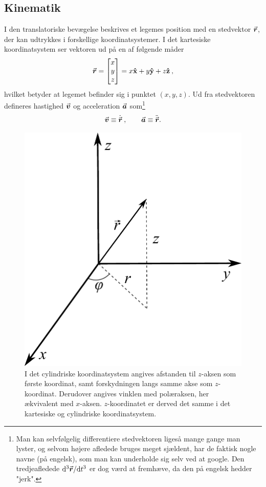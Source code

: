 \subsection{Kinematik}
I den translatoriske bevægelse beskrives et legemes position med en stedvektor ${\vec{\boldsymbol{r}}}$, der kan udtrykkes i forskellige koordinatsystemer. I det kartesiske koordinatsystem ser vektoren ud på en af følgende måder
%
\begin{align*}
	{\vec{\boldsymbol{r}}} = \begin{bmatrix} x \\ y \\ z \end{bmatrix} = x\mathbf{\hat{x}} + y\mathbf{\hat{y}} + z\mathbf{\hat{z}} \: ,
\end{align*}
%
hvilket betyder at legemet befinder sig i punktet $(x,y,z)$. Ud fra stedvektoren defineres hastighed ${\vec{\boldsymbol{v}}}$ og acceleration ${\vec{\boldsymbol{a}}}$ som\footnote{Man kan selvfølgelig differentiere stedvektoren ligeså mange gange man lyster, og selvom højere afledede bruges meget sjældent, har de faktisk nogle navne (på engelsk), som man kan underholde sig selv ved at google. Den tredjeafledede $\mathrm{d}^3{\vec{\boldsymbol{r}}}/\mathrm{d} t^3$ er dog værd at fremhæve, da den på engelsk hedder "jerk".}
\begin{equation}
    {\vec{\boldsymbol{v}}} \equiv \dot{{\vec{\boldsymbol{r}}}} \: , \qquad {\vec{\boldsymbol{a}}} \equiv \ddot{{\vec{\boldsymbol{r}}}}.
\end{equation}
%
\begin{figure}[h!]
\centering
\includegraphics[width=.4\textwidth]{Analytisk-Mekanik/CylindriskeKoordinater}
\caption{I det cylindriske koordinatsystem angives afstanden til $z$-aksen som første koordinat, samt forskydningen langs samme akse som $z$-koordinat. Derudover angives vinklen med polæraksen, her ækvivalent med $x$-aksen. $z$-koordinatet er derved det samme i det kartesiske og cylindriske koordinatsystem.}
\label{fig:CylindriskeKoordinater}
\end{figure}
%
%
